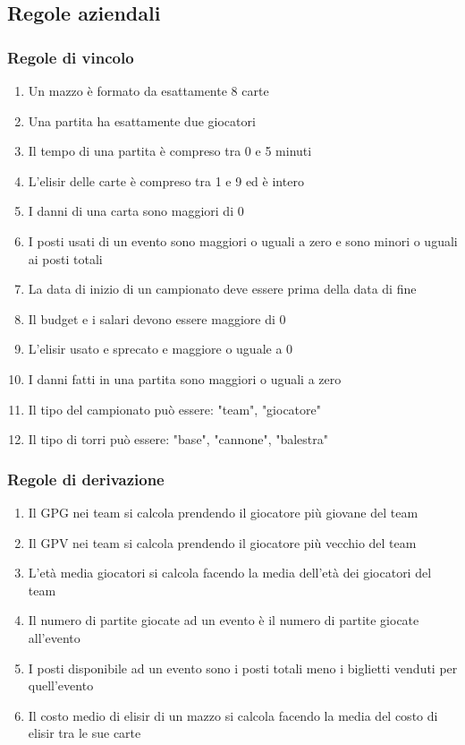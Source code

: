\documentclass{article}
\begin{document}
\subsection{Regole aziendali}

\subsubsection{Regole di vincolo}
\begin{enumerate}
    \item Un mazzo è formato da esattamente 8 carte
    \item Una partita ha esattamente due giocatori
    \item Il tempo di una partita è compreso tra 0 e 5 minuti
    \item L'elisir delle carte è compreso tra 1 e 9 ed è intero
    \item I danni di una carta sono maggiori di 0
    \item I posti usati di un evento sono maggiori o uguali a zero e sono minori o uguali ai posti totali %
    \item La data di inizio di un campionato deve essere prima della data di fine
    \item Il budget e i salari devono essere maggiore di 0
    \item L'elisir usato e sprecato e maggiore o uguale a 0
    \item I danni fatti in una partita sono maggiori o uguali a zero
    \item Il tipo del campionato può essere: "team", "giocatore"
    \item Il tipo di torri può essere: "base", "cannone", "balestra"
\end{enumerate}

\subsubsection{Regole di derivazione}
\begin{enumerate}
    \item Il GPG nei team si calcola prendendo il giocatore più giovane del team
    \item Il GPV nei team si calcola prendendo il giocatore più vecchio del team
    \item L'età media giocatori si calcola facendo la media dell'età dei giocatori del team
    \item Il numero di partite giocate ad un evento è il numero di partite giocate all'evento
    \item I posti disponibile ad un evento sono i posti totali meno i biglietti venduti per quell'evento
    \item Il costo medio di elisir di un mazzo si calcola facendo la media del costo di elisir tra le sue carte
\end{enumerate}
\end{document}
